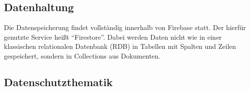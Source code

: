 \subsection{Datenhaltung}
Die Datenspeicherung findet vollständig innerhalb von Firebase statt.
Der hierfür genutzte Service heißt \enquote{Firestore}.
Dabei werden Daten nicht wie in einer klassischen relationalen Datenbank (\ac{RDB}) in Tabellen mit Spalten und Zeilen gespeichert, sondern in Collections aus Dokumenten.




\subsection{Datenschutzthematik}




\autocite{redHatServerless}


